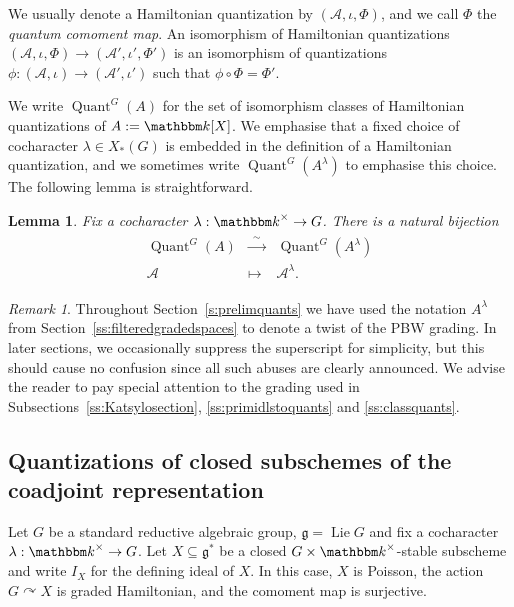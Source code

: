\documentclass[twoside,12pt,reqno]{amsart}
\newtheorem{Lemma}[Theorem]{Lemma}
\theoremstyle{remark}
\newtheorem{Remark}[Theorem]{Remark}
\numberwithin{equation}{section}
\def\k{{\mathbbm k}}
\def\Lie{\operatorname{Lie}}
\def\Quant{\operatorname{Quant}}
\def\g{{\mathfrak g}}
\def\cA{\mathcal{A}}
\newcommand{\A}{\mathcal{A}}
\begin{document}
We usually denote a Hamiltonian quantization by $(\A, \iota, \Phi)$, and we call $\Phi$ the {\it quantum comoment map}. An isomorphism of Hamiltonian quantizations $(\cA,\iota,\Phi)\to (\cA',\iota',\Phi')$ is an isomorphism of quantizations $\phi:(\cA,\iota)\to(\cA',\iota')$ such that $\phi\circ\Phi=\Phi'$.

We write $\Quant^G(A)$ for the set of isomorphism classes of Hamiltonian quantizations of $A := \k[X]$. We emphasise that a fixed choice of cocharacter $\lambda \in X_*(G)$ is embedded in the definition of a Hamiltonian quantization, and we sometimes write $\Quant^G(A^\lambda)$ to emphasise this choice. The following lemma is straightforward.
\begin{Lemma}\label{L:twistquant}
    Fix a cocharacter $\lambda:\k^\times\to G$. There is a natural bijection
    \begin{eqnarray*}
    \begin{array}{rcl}
        \Quant^G(A) & \xrightarrow{\,\,\,\sim\,\,\,} & \Quant^G(A^\lambda)\\
        \A & \longmapsto & \A^\lambda.
        \end{array}
    \end{eqnarray*}
\end{Lemma}
\begin{Remark}
\label{R:changinggradings}
    Throughout Section~\ref{s:prelimquants} we have used the notation $A^\lambda$ from Section~\ref{ss:filteredgradedspaces} to denote a twist of the PBW grading. In later sections, we occasionally suppress the superscript for simplicity, but this should cause no confusion since all such abuses are clearly announced. We advise the reader to pay special attention to the grading used in Subsections~\ref{ss:Katsylosection}, \ref{ss:primidlstoquants} and \ref{ss:classquants}. 
\end{Remark}

\subsection{Quantizations of closed subschemes of the coadjoint representation}
\label{ss:quantclosedsubschemes}

Let $G$ be a standard reductive algebraic group, $\g = \Lie G$ and fix a cocharacter $\lambda :  \k^\times  \to G$. Let $X \subseteq \g^*$ be a closed $G\times \k^\times$-stable subscheme and write $I_X$ for the defining ideal of $X$. In this case, $X$ is Poisson, the action $G \curvearrowright X$ is graded Hamiltonian, and the comoment map is surjective.
\end{document}
